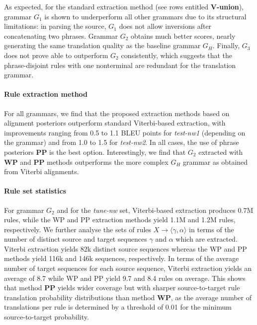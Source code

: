 As expected, for the standard extraction method (see
rows entitled {\bf V-union}), grammar $G_1$ is shown to underperform all other
grammars due to its structural limitations: in parsing the source, $G_1$
does not allow inversions after concatenating two phrases. %
Grammar $G_2$
obtains much better scores, nearly generating the same translation quality as
the baseline grammar $G_H$. Finally, $G_3$ does not prove able to outperform
$G_2$ consistently, which suggests that the phrase-disjoint rules with one nonterminal are
redundant for the translation grammar.
    
\paragraph{Rule extraction method}

For all grammars, we find that the proposed
extraction methods based on alignment posteriors outperform standard
Viterbi-based extraction, with improvements ranging from 0.5 to 1.1 BLEU points
for {\em test-nw1} (depending on the grammar) and from 1.0 to 1.5 for
{\em test-nw2}. In all cases, the use of phrase posteriors {\bf PP} is the best
option. Interestingly, we find that $G_2$ extracted with {\bf WP} and {\bf PP}
methods outperforms the more complex $G_H$ grammar as obtained from Viterbi
alignments.
    
\paragraph{Rule set statistics}

For grammar $G_2$ and for the {\em tune-nw} set,
Viterbi-based extraction produces 0.7M rules, while the WP and PP extraction
methods yield 1.1M and 1.2M rules, respectively. We further analyse the sets of
rules $X \rightarrow \langle \gamma,\alpha \rangle$ in terms of the number of
distinct source and target sequences $\gamma$ and $\alpha$ which are extracted.
Viterbi extraction yields 82k distinct source sequences whereas the WP and PP
methods yield 116k and 146k sequences, respectively. In terms of the average
number of target sequences for each source sequence, Viterbi extraction yields
an average of 8.7 while WP and PP yield 9.7 and 8.4 rules on average. This shows
that method {\bf PP} yields wider coverage but with sharper source-to-target
rule translation probability distributions than method {\bf WP}, as the average
number of translations per rule is determined by a threshold of 0.01 for
the minimum source-to-target probability. %

